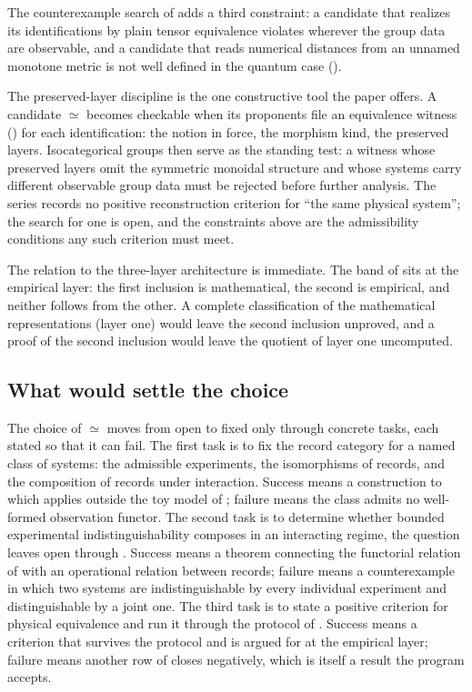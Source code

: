 \documentclass[11pt,letterpaper]{article}
\theoremstyle{definition}
\theoremstyle{remark}
\begin{document}
The counterexample search of  adds a third constraint: a candidate that realizes its identifications by plain tensor equivalence violates  wherever the group data are observable, and a candidate that reads numerical distances from an unnamed monotone metric is not well defined in the quantum case ().

The preserved-layer discipline is the one constructive tool the paper offers. A candidate $\simeq$ becomes checkable when its proponents file an equivalence witness () for each identification: the notion in force, the morphism kind, the preserved layers. Isocategorical groups then serve as the standing test: a witness whose preserved layers omit the symmetric monoidal structure and whose systems carry different observable group data must be rejected before further analysis. The series records no positive reconstruction criterion for ``the same physical system''; the search for one is open, and the constraints above are the admissibility conditions any such criterion must meet.

The relation to the three-layer architecture is immediate. The band of  sits at the empirical layer: the first inclusion is mathematical, the second is empirical, and neither follows from the other. A complete classification of the mathematical representations (layer one) would leave the second inclusion unproved, and a proof of the second inclusion would leave the quotient of layer one uncomputed.

\subsection{What would settle the choice}

The choice of $\simeq$ moves from open to fixed only through concrete tasks, each stated so that it can fail. The first task is to fix the record category for a named class of systems: the admissible experiments, the isomorphisms of records, and the composition of records under interaction. Success means a construction to which  applies outside the toy model of ; failure means the class admits no well-formed observation functor. The second task is to determine whether bounded experimental indistinguishability composes in an interacting regime, the question  leaves open through . Success means a theorem connecting the functorial relation of  with an operational relation between records; failure means a counterexample in which two systems are indistinguishable by every individual experiment and distinguishable by a joint one. The third task is to state a positive criterion for physical equivalence and run it through the protocol of . Success means a criterion that survives the protocol and is argued for at the empirical layer; failure means another row of  closes negatively, which is itself a result the program accepts.
\end{document}
